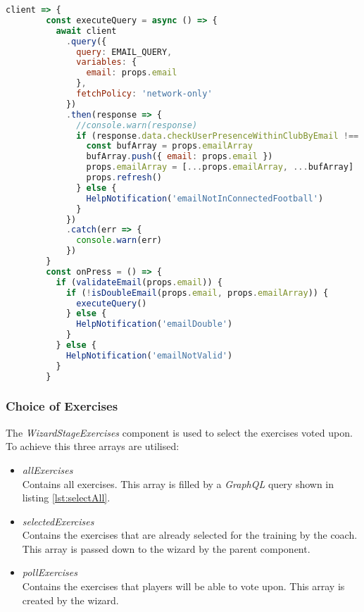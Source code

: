 \begin{lstlisting}[language=javascript, caption=Check in \textit{Connected.Football} environment, label=lst:pollGuestGraphQLCheck]
client => {
        const executeQuery = async () => {
          await client
            .query({
              query: EMAIL_QUERY,
              variables: {
                email: props.email
              },
              fetchPolicy: 'network-only'
            })
            .then(response => { 
              //console.warn(response)
              if (response.data.checkUserPresenceWithinClubByEmail !== null) {
                const bufArray = props.emailArray
                bufArray.push({ email: props.email })
                props.emailArray = [...props.emailArray, ...bufArray]
                props.refresh()
              } else {
                HelpNotification('emailNotInConnectedFootball')
              }
            })
            .catch(err => {
              console.warn(err)
            })
        }
        const onPress = () => {
          if (validateEmail(props.email)) {
            if (!isDoubleEmail(props.email, props.emailArray)) {
              executeQuery()
            } else {
              HelpNotification('emailDouble')
            }
          } else {
            HelpNotification('emailNotValid')
          }
        }
\end{lstlisting}

\subsubsection{Choice of Exercises}
\label{sssec:poll_exercises}

The \textit{WizardStageExercises} component is used to select the exercises voted upon. To achieve this three arrays are utilised:

\begin{itemize}
    \item \textit{allExercises}\\
    Contains all exercises. This array is filled by a \textit{GraphQL} query shown in listing \ref{lst:selectAll}.
    \item \textit{selectedExercises}\\
    Contains the exercises that are already selected for the training by the coach. This array is passed down to the wizard by the parent component.
    \item \textit{pollExercises}\\
    Contains the exercises that players will be able to vote upon. This array is created by the wizard.
\end{itemize}

